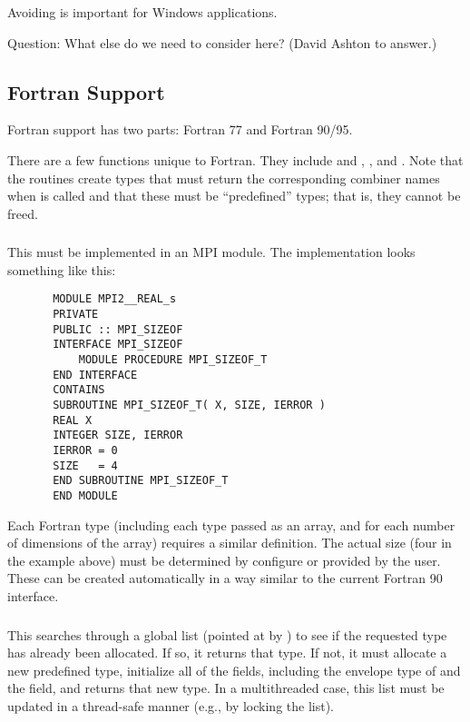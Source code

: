 \documentclass{article}
\begin{document}
Avoiding  is important for Windows applications.

Question: What else do we need to consider here? (David Ashton to answer.)

\subsection{Fortran Support}
\label{sec:fortran}
Fortran support has two parts: Fortran 77 and Fortran 90/95.  

There are a few functions unique to Fortran.  They include
 and , 
, and 
.  Note that the 
routines create types that must return the corresponding combiner names when
 is called and that these must be
``predefined'' types; that is, they cannot be freed.

\subsubsection{}
This must be implemented in an MPI module.  The implementation looks something
like this:
\begin{verbatim}
       MODULE MPI2__REAL_s
       PRIVATE
       PUBLIC :: MPI_SIZEOF
       INTERFACE MPI_SIZEOF
           MODULE PROCEDURE MPI_SIZEOF_T
       END INTERFACE
       CONTAINS
       SUBROUTINE MPI_SIZEOF_T( X, SIZE, IERROR )
       REAL X
       INTEGER SIZE, IERROR
       IERROR = 0
       SIZE   = 4
       END SUBROUTINE MPI_SIZEOF_T       
       END MODULE
\end{verbatim}
Each Fortran type (including each type passed as an array, and for
each number of dimensions of the array) requires a similar
definition.  The actual size (four in the example above) must be determined by
configure or provided by the user.
These can be created automatically in a way similar to the current
Fortran 90 interface.

\subsubsection{}
This searches through a global list (pointed at by
) to see if the requested type has
already been allocated.  If so, it returns that type.  
If not, it must allocate a new predefined type, initialize all of the fields,
including the envelope type of  and the
 field, and returns that new type.
In a multithreaded case, this list must be updated in a thread-safe manner
(e.g., by locking the list).
\end{document}
